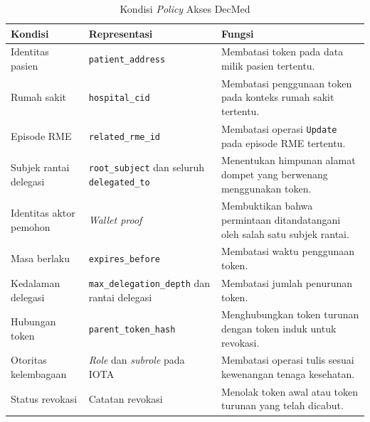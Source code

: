\begin{table}[H]
	\centering
	\caption{Kondisi \textit{Policy} Akses DecMed}
	\label{tab:pemetaan-kondisi-policy-decmed}
	\small
	\begin{tabular}{|p{}|p{}|p{}|}
		\hline
		\textbf{Kondisi}
		 & \textbf{Representasi}
		 & \textbf{Fungsi}                                                            \\ \hline

		Identitas pasien
		 & \texttt{patient\_address}
		 & Membatasi token pada data milik pasien tertentu.                           \\ \hline

		Rumah sakit
		 & \texttt{hospital\_cid}
		 & Membatasi penggunaan token pada konteks rumah sakit tertentu.              \\ \hline

		Episode RME
		 & \texttt{related\_rme\_id}
		 & Membatasi operasi \texttt{Update} pada episode RME tertentu.               \\ \hline

		Subjek rantai delegasi
		 & \texttt{root\_subject} dan seluruh \texttt{delegated\_to}
		 & Menentukan himpunan alamat dompet yang berwenang menggunakan token.        \\ \hline

		Identitas aktor pemohon
		 & \textit{Wallet proof}
		 & Membuktikan bahwa permintaan ditandatangani oleh salah satu subjek rantai. \\ \hline

		Masa berlaku
		 & \texttt{expires\_before}
		 & Membatasi waktu penggunaan token.                                          \\ \hline

		Kedalaman delegasi
		 & \texttt{max\_delegation\_depth} dan rantai delegasi
		 & Membatasi jumlah penurunan token.                                          \\ \hline

		Hubungan token
		 & \texttt{parent\_token\_hash}
		 & Menghubungkan token turunan dengan token induk untuk revokasi.             \\ \hline

		Otoritas kelembagaan
		 & \textit{Role} dan \textit{subrole} pada IOTA
		 & Membatasi operasi tulis sesuai kewenangan tenaga kesehatan.                \\ \hline

		Status revokasi
		 & Catatan revokasi
		 & Menolak token awal atau token turunan yang telah dicabut.                  \\ \hline
	\end{tabular}

\end{table}

